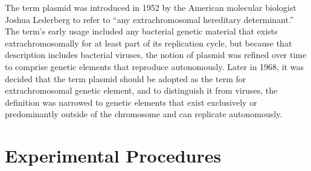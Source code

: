 \documentclass[]{book}
\begin{document}
The term plasmid was introduced in 1952 by the American molecular biologist Joshua Lederberg to refer to ``any extrachromosomal hereditary determinant.'' The term's early usage included any bacterial genetic material that exists extrachromosomally for at least part of its replication cycle, but because that description includes bacterial viruses, the notion of plasmid was refined over time to comprise genetic elements that reproduce autonomously. Later in 1968, it was decided that the term plasmid should be adopted as the term for extrachromosomal genetic element, and to distinguish it from viruses, the definition was narrowed to genetic elements that exist exclusively or predominantly outside of the chromosome and can replicate autonomously.

\hypertarget{experimental-procedures-16}{%
\section{Experimental Procedures}\label{experimental-procedures-16}}
\end{document}
